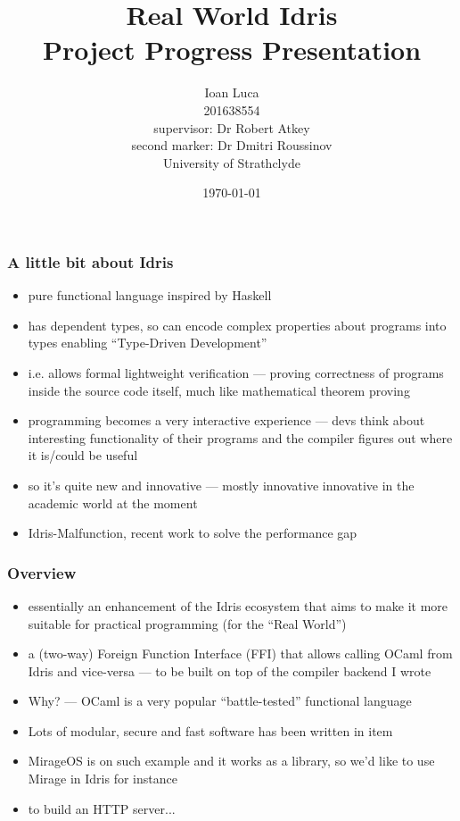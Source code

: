 \documentclass{beamer}
\title{Real World Idris \\ Project Progress Presentation}
\author{Ioan Luca \\ 201638554 \\ \small supervisor: Dr Robert Atkey \\
	\small second marker: Dr Dmitri Roussinov \\
	\small University of Strathclyde} %
\date{\today}
\begin{document}
\frame{\titlepage}


\begin{frame}
	\frametitle{A little bit about Idris}
	\begin{itemize}
		\item pure functional language inspired by Haskell
		\item has dependent types, so can encode complex properties
		      about programs into types enabling ``Type-Driven Development''
		\item i.e. allows formal lightweight verification --- proving
		      correctness of programs inside the source code itself,
		      much like mathematical theorem proving
		\item programming becomes a very interactive experience
		      --- devs think about interesting functionality of their programs
		      and the compiler figures out where it is/could be useful
		\item so it's quite new and innovative --- mostly innovative innovative
		      in the academic world at the moment
		\item Idris-Malfunction, recent work to solve the performance gap
	\end{itemize}
\end{frame}


\begin{frame}
	\frametitle{Overview}

	\begin{itemize}
		\item essentially an enhancement of the Idris ecosystem
		that aims to make it more suitable for practical
		programming (for the ``Real World'')
		\item a (two-way) Foreign Function Interface (FFI) that
		      allows calling OCaml
		      from Idris and vice-versa --- to be built on top of the
		      compiler backend I wrote
		\item Why? --- OCaml is a very popular ``battle-tested'' 
			  functional language
	    \item Lots of modular, secure and fast software has been written in item
	    \item MirageOS is on such example and it works as a library, so we'd 
			  like to use Mirage in Idris for instance
		\item to build an HTTP server...
	\end{itemize}
\end{frame}
\end{document}
